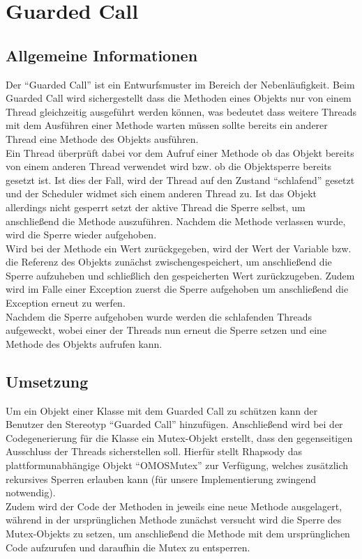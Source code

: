 \chapter{Guarded Call}

\section{Allgemeine Informationen}
Der \enquote{Guarded Call} ist ein Entwurfsmuster im Bereich der Nebenläufigkeit. Beim Guarded Call wird sichergestellt dass die Methoden eines Objekts nur von einem Thread gleichzeitig ausgeführt werden können, was bedeutet dass weitere Threads mit dem Ausführen einer Methode warten müssen sollte bereits ein anderer Thread eine Methode des Objekts ausführen. \cite[S. 190]{douglass2010design}
\\
Ein Thread überprüft dabei vor dem Aufruf einer Methode ob das Objekt bereits von einem anderen Thread verwendet wird bzw. ob die Objektsperre bereits gesetzt ist. Ist dies der Fall, wird der Thread auf den Zustand \enquote{schlafend} gesetzt und der Scheduler widmet sich einem anderen Thread zu. Ist das Objekt allerdings nicht gesperrt setzt der aktive Thread die Sperre selbst, um anschließend die Methode auszuführen. Nachdem die Methode verlassen wurde, wird die Sperre wieder aufgehoben.
\\
Wird bei der Methode ein Wert zurückgegeben, wird der Wert der Variable bzw. die Referenz des Objekts zunächst zwischengespeichert, um anschließend die Sperre aufzuheben und schließlich den gespeicherten Wert zurückzugeben. Zudem wird im Falle einer Exception zuerst die Sperre aufgehoben um anschließend die Exception erneut zu werfen.
\\
Nachdem die Sperre aufgehoben wurde werden die schlafenden Threads aufgeweckt, wobei einer der Threads nun erneut die Sperre setzen und eine Methode des Objekts aufrufen kann.

\section{Umsetzung}
Um ein Objekt einer Klasse mit dem Guarded Call zu schützen kann der Benutzer den Stereotyp \enquote{Guarded Call} hinzufügen. Anschließend wird bei der Codegenerierung für die Klasse ein Mutex-Objekt erstellt, dass den gegenseitigen Ausschluss der Threads sicherstellen soll. Hierfür stellt Rhapsody das plattformunabhängige Objekt \enquote{OMOSMutex} zur Verfügung, welches zusätzlich rekursives Sperren erlauben kann (für unsere Implementierung zwingend notwendig).
\\
Zudem wird der Code der Methoden in jeweils eine neue Methode ausgelagert, während in der ursprünglichen Methode zunächst versucht wird die Sperre des Mutex-Objekts zu setzen, um anschließend die Methode mit dem ursprünglichen Code aufzurufen und daraufhin die Mutex zu entsperren.

